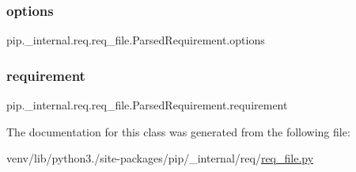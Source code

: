\subsubsection{\texorpdfstring{options}{options}}
{\footnotesize\ttfamily pip.\+\_\+internal.\+req.\+req\+\_\+file.\+Parsed\+Requirement.\+options\hspace{0.3cm}{\ttfamily [static]}}

\mbox{\label{classpip_1_1__internal_1_1req_1_1req__file_1_1ParsedRequirement_ae020aca19e8a4ee623913855998296c2}} 
\subsubsection{\texorpdfstring{requirement}{requirement}}
{\footnotesize\ttfamily pip.\+\_\+internal.\+req.\+req\+\_\+file.\+Parsed\+Requirement.\+requirement\hspace{0.3cm}{\ttfamily [static]}}



The documentation for this class was generated from the following file\+:\begin{DoxyCompactItemize}
\item 
venv/lib/python3./site-\/packages/pip/\+\_\+internal/req/\hyperlink{req__file_8py}{req\+\_\+file.\+py}\end{DoxyCompactItemize}

